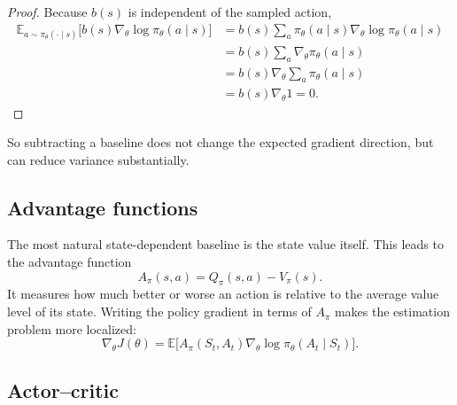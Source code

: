 \documentclass[11pt]{article}
\newcommand{\E}{\mathbb{E}}
\newcommand{\1}{\mathbf{1}}
\begin{document}
\begin{proof}
Because $b(s)$ is independent of the sampled action,
\begin{align*}
\E_{a\sim \pi_\theta(\cdot\mid s)}\bigl[b(s)\nabla_\theta\log\pi_\theta(a\mid s)\bigr]
&= b(s)\sum_a \pi_\theta(a\mid s)\nabla_\theta\log\pi_\theta(a\mid s) \\
&= b(s)\sum_a \nabla_\theta \pi_\theta(a\mid s) \\
&= b(s)\nabla_\theta \sum_a \pi_\theta(a\mid s) \\
&= b(s)\nabla_\theta 1 = 0.
\end{align*}
\end{proof}

So subtracting a baseline does not change the expected gradient direction, but can reduce variance substantially.

\subsection{Advantage functions}

The most natural state-dependent baseline is the state value itself. This leads to the advantage function
\begin{equation}
A_\pi(s,a)=Q_\pi(s,a)-V_\pi(s).
\end{equation}
It measures how much better or worse an action is relative to the average value level of its state. Writing the policy gradient in terms of $A_\pi$ makes the estimation problem more localized:
\begin{equation}
\nabla_\theta J(\theta)=\E\bigl[A_\pi(S_t,A_t)\nabla_\theta\log\pi_\theta(A_t\mid S_t)\bigr].
\end{equation}

\subsection{Actor--critic}
\end{document}
